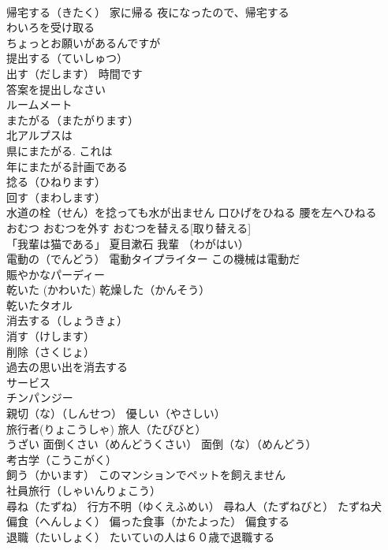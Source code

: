 \documentclass[8pt]{extreport}
\begin{document}
\begin{CJK}{UTF8}{min}
\\	帰宅する（きたく） 家に帰る 夜になったので、帰宅する
\\	わいろを受け取る
\\	ちょっとお願いがあるんですが
\\	提出する（ていしゅつ）
\\	出す（だします） 時間です
\\	答案を提出しなさい
\\	ルームメート
\\	またがる（またがります）
\\	北アルプスは 
\\	県にまたがる. これは 
\\	年にまたがる計画である
\\	捻る（ひねります） 
\\	回す（まわします）
\\	水道の栓（せん）を捻っても水が出ません 口ひげをひねる 腰を左へひねる
\\	おむつ おむつを外す おむつを替える[取り替える]
\\	「我輩は猫である」 夏目漱石 我輩 （わがはい） 
\\	電動の（でんどう） 電動タイプライター この機械は電動だ
\\	賑やかなパーディー
\\	乾いた (かわいた) 乾燥した（かんそう）
\\	乾いたタオル
\\	消去する（しょうきょ）
\\	消す（けします）
\\	削除（さくじょ）
\\	過去の思い出を消去する
\\	サービス
\\	チンパンジー
\\	親切（な）（しんせつ） 優しい（やさしい）
\\	旅行者(りょこうしゃ) 旅人（たびびと）
\\	うざい 面倒くさい（めんどうくさい） 面倒（な）（めんどう）
\\	考古学（こうこがく）
\\	飼う（かいます） このマンションでペットを飼えません
\\	社員旅行（しゃいんりょこう）
\\	尋ね（たずね） 行方不明（ゆくえふめい） 尋ね人（たずねびと） たずね犬
\\	偏食（へんしょく） 偏った食事（かたよった） 偏食する
\\	退職（たいしょく） たいていの人は６０歳で退職する

\end{CJK}
\end{document}
